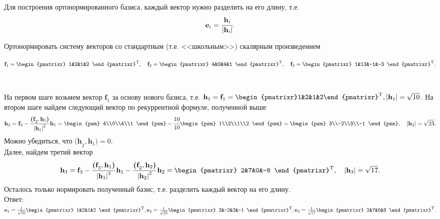 Для построения ортонормированного базиса, каждый вектор нужно разделить на его длину, т.е.
$$
\textbf{e}_i=\cfrac{\textbf{h}_i}{\left|\textbf{h}_i\right|}.
$$
\begin{prim}
Ортонормировать систему векторов со стандартным (т.е. <<школьным>>) скалярным произведением
\begin{center}
		$
		\textbf{f}_1 = \begin{pmatrixr}
			1&2&1&2
		\end{pmatrixr}^{\text{T}}, \quad \textbf{f}_2 = \begin{pmatrixr}
		4&0&4&1
		\end{pmatrixr}^{\text{T}}, \quad \textbf{f$_3$} = \begin{pmatrixr}
		1&13&-1&-3
		\end{pmatrixr}^{\text{T}}.
		$
\end{center}
~\
\end{prim}
На первом шаге возьмем вектор $\textbf{f}_1$ за основу нового базиса, т.е. $\textbf{h}_1 = \textbf{f}_1 =\begin{pmatrixr}1&2&1&2\end{pmatrixr}^{\text{T}}, \abs{\textbf{h}_1} = \sqrt{10}$. На втором шаге найдем следующий вектор по рекуррентной формуле, полученной выше
$$
\textbf{h}_2 = \textbf{f}_2 - \cfrac{\textbf{(f}_2, \textbf{h}_1\textbf{)}}{\abs{\textbf{h}_1}^2}\, \textbf{h}_1=\begin{psm}
4\\0\\4\\1
\end{psm} - \cfrac{10}{10} \begin{psm}
1\\2\\1\\2
\end{psm}=\begin{psm}
3\\-2\\3\\-1
\end{psm}, \quad \abs{\textbf{h}_2} = \sqrt{23}.
$$
Можно убедиться, что $\textbf{(h}_2, \textbf{h}_1\textbf{)} = 0$.\\
Далее, найдем третий вектор
$$
\textbf{h}_3=\textbf{f}_3-\cfrac{\textbf{(f}_3, \textbf{h}_1\textbf{)}}{\abs{\textbf{h}_1}^2}\, \textbf{h}_1-\cfrac{\textbf{(f}_2, \textbf{h}_2\textbf{)}}{\abs{\textbf{h}_2}^2}\, \textbf{h}_2=\begin{pmatrixr}
2&7&0&-8
\end{pmatrixr}^\text{T}, \quad \abs{\textbf{h}_3} = \sqrt{17}.
$$
Осталось только нормировать полученный базис, т.е. разделить каждый вектор на его длину.\\
Ответ:
$\textbf{e}_1=\frac{1}{\sqrt{10}}\begin{pmatrixr}
	1&2&1&2
\end{pmatrixr}^\text{T},
\textbf{e}_2=\frac{1}{\sqrt{23}}\begin{pmatrixr}
3&-2&3&-1
\end{pmatrixr}^\text{T},
\textbf{e}_3=\frac{1}{\sqrt{17}}\begin{pmatrixr}
2&7&0&8
\end{pmatrixr}^\text{T}.
$

